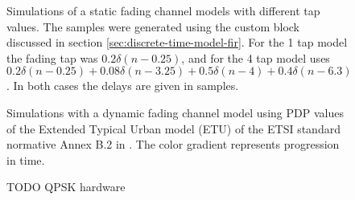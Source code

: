 \begin{figure}
	\centering
	\label{qpsk-simulations-static}
	
	\caption{
		Simulations of a static fading channel models with different tap values. The samples were generated using the custom block discussed in section \ref{sec:discrete-time-model-fir}. For the 1 tap model the fading tap was \(0.2\delta(n - 0.25)\), and for the 4 tap model uses \(0.2 \delta(n - 0.25) + 0.08 \delta(n - 3.25) + 0.5 \delta(n - 4) + 0.4 \delta(n - 6.3)\). In both cases the delays are given in samples.
	}
\end{figure}
\newpage
\begin{figure}
	\centering
	
	\caption{
		Simulations with a dynamic fading channel model using PDP values of the Extended Typical Urban model (ETU) of the ETSI standard normative Annex B.2 in \cite{ETSI}. The color gradient represents progression in time.
	}
\end{figure}
\newpage
\begin{figure}
	\centering
	
	\caption{
		TODO QPSK hardware
	}
\end{figure}
\restoregeometry
